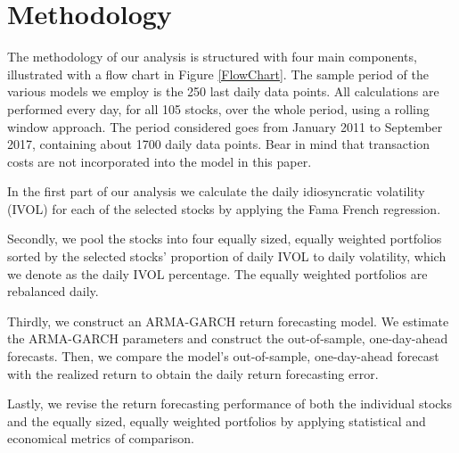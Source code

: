 \chapter{Methodology}
\label{Methodology}

The methodology of our analysis is structured with four main components, illustrated with a flow chart in Figure \ref{FlowChart}. The sample period of the various models we employ is the 250 last daily data points. All calculations are performed every day, for all 105 stocks, over the whole period, using a rolling window approach. The period considered goes from January 2011 to September 2017, containing about 1700 daily data points. Bear in mind that transaction costs are not incorporated into the model in this paper.

In the first part of our analysis we calculate the daily idiosyncratic volatility (IVOL) for each of the selected stocks by applying the Fama French regression.

Secondly, we pool the stocks into four equally sized, equally weighted portfolios sorted by the selected stocks' proportion of daily IVOL to daily volatility, which we denote as the daily IVOL percentage. The equally weighted portfolios are rebalanced daily.

Thirdly, we construct an ARMA-GARCH return forecasting model. We estimate the ARMA-GARCH parameters and construct the out-of-sample, one-day-ahead forecasts. Then, we compare the model’s out-of-sample, one-day-ahead forecast with the realized return to obtain the daily return forecasting error. 

Lastly, we revise the return forecasting performance of both the individual stocks and the equally sized, equally weighted portfolios by applying statistical and economical metrics of comparison.


